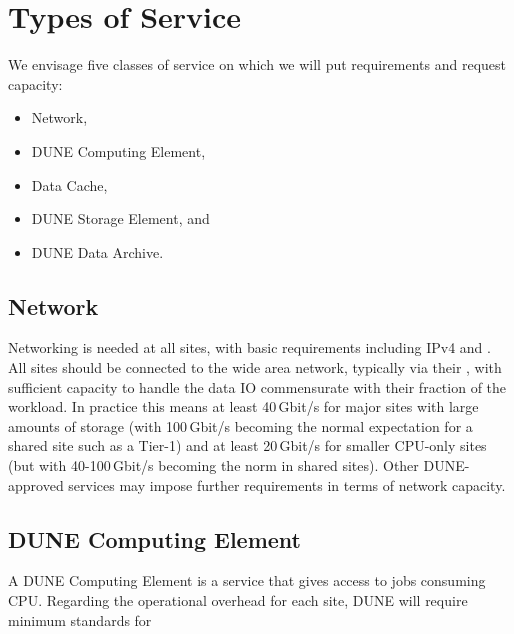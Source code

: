 \documentclass[../main-v1.tex]{subfiles}
\begin{document}
\section{Types of Service}
\label{sec:cm:types_of_service}

We envisage five classes of service on which we will put requirements and request capacity:

\begin{itemize}
    \item Network,
    \item DUNE Computing Element,
    \item Data Cache,
    \item DUNE Storage Element, and
    \item DUNE Data Archive.
\end{itemize}

\subsection{Network}
\label{sec:cm:network}

Networking is needed at all sites, with basic requirements including IPv4 and . %
All sites should be connected to the wide area network, typically via their , with sufficient capacity to handle the data IO commensurate with their fraction of the workload. In practice this means at least 40\,Gbit/s for major sites with large amounts of storage (with 100\,Gbit/s becoming the normal expectation for a shared site such as a  Tier-1) and at least 20\,Gbit/s for smaller CPU-only sites (but with 40-100\,Gbit/s becoming the norm in shared sites).
Other DUNE-approved services may impose further requirements in terms of network capacity. %

\subsection{DUNE Computing Element}
\label{sec:cm:dce}

A DUNE Computing Element is a service that gives access to jobs consuming CPU. %
Regarding the operational overhead %
for each site, DUNE will require  minimum standards for
\end{document}
